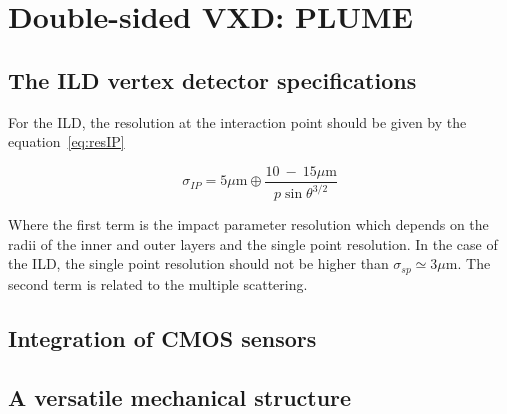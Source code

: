 \chapter{Double-sided VXD: PLUME}
\label{chap:vxd}

  
  \section{The ILD vertex detector specifications}

    For the ILD, the resolution at the interaction point should be given by the equation~\ref{eq:resIP}

    \begin{equation}
      \sigma_{IP} = 5 \mu\text{m} \oplus \frac{10 \ - \ 15 \mu\text{m}}{p \sin{\theta}^{3/2} }
      \label{eq:resIP}
    \end{equation}

    Where the first term is the impact parameter resolution which depends on the radii of the inner and outer layers and the single point resolution. 
    In the case of the ILD, the single point resolution should not be higher than $\sigma_{sp} \simeq 3 \mu\text{m}$.
    The second term is related to the multiple scattering. 


  \section{Integration of CMOS sensors}

  \section{A versatile mechanical structure}
